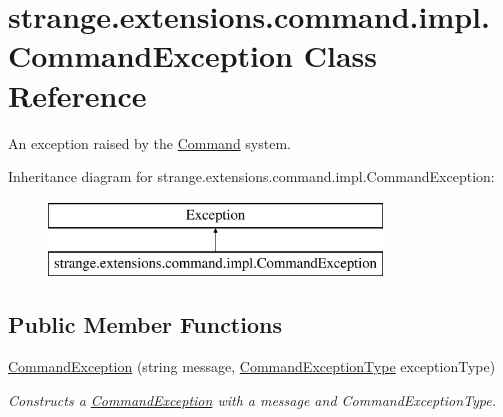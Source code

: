 \hypertarget{classstrange_1_1extensions_1_1command_1_1impl_1_1_command_exception}{\section{strange.\-extensions.\-command.\-impl.\-Command\-Exception Class Reference}
\label{classstrange_1_1extensions_1_1command_1_1impl_1_1_command_exception}
}


An exception raised by the \hyperlink{classstrange_1_1extensions_1_1command_1_1impl_1_1_command}{Command} system.  


Inheritance diagram for strange.\-extensions.\-command.\-impl.\-Command\-Exception\-:\begin{figure}[H]
\begin{center}
\leavevmode
\includegraphics[height=2.000000cm]{classstrange_1_1extensions_1_1command_1_1impl_1_1_command_exception}
\end{center}
\end{figure}
\subsection*{Public Member Functions}
\begin{DoxyCompactItemize}
\item 
\hypertarget{classstrange_1_1extensions_1_1command_1_1impl_1_1_command_exception_a4f1fa88eecb0e5217c3852570492ddb5}{\hyperlink{classstrange_1_1extensions_1_1command_1_1impl_1_1_command_exception_a4f1fa88eecb0e5217c3852570492ddb5}{Command\-Exception} (string message, \hyperlink{namespacestrange_1_1extensions_1_1command_1_1api_a27c9226cc8d55624f3294319d48879e3}{Command\-Exception\-Type} exception\-Type)}\label{classstrange_1_1extensions_1_1command_1_1impl_1_1_command_exception_a4f1fa88eecb0e5217c3852570492ddb5}

\begin{DoxyCompactList}\small\item\em Constructs a \hyperlink{classstrange_1_1extensions_1_1command_1_1impl_1_1_command_exception}{Command\-Exception} with a message and Command\-Exception\-Type. \end{DoxyCompactList}\end{DoxyCompactItemize}
